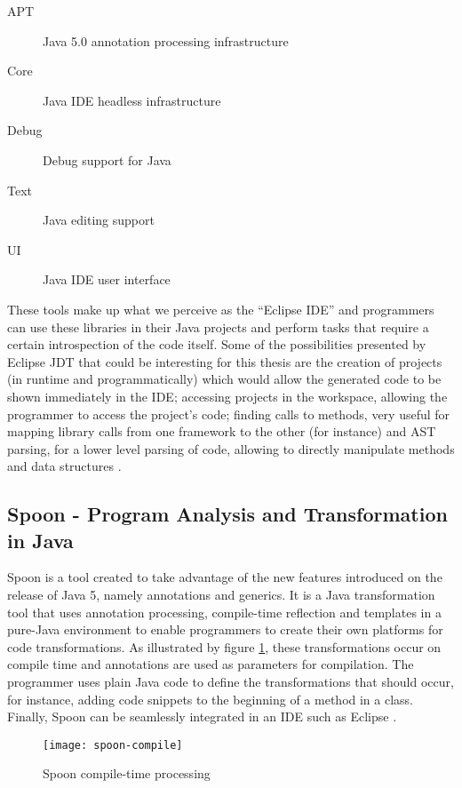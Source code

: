 	\begin{description}
		\item[APT] Java 5.0 annotation processing infrastructure
		\item[Core] Java IDE headless infrastructure
		\item[Debug] Debug support for Java
		\item[Text] Java editing support
		\item[UI] Java IDE user interface 
	\end{description}

	These tools make up what we perceive as the ``Eclipse IDE'' and programmers can use these libraries in their Java projects and perform tasks that require a certain introspection of the code itself. Some of the possibilities presented by Eclipse JDT that could be interesting for this thesis are the creation of projects (in runtime and programmatically) which would allow the generated code to be shown immediately in the IDE; accessing projects in the workspace, allowing the programmer to access the project's code; finding calls to methods, very useful for mapping library calls from one framework to the other (for instance) and AST parsing, for a lower level parsing of code, allowing to directly manipulate methods and data structures \cite{eclipseJDT}.


\subsection{Spoon - Program Analysis and Transformation in Java}
	Spoon is a tool created to take advantage of the new features introduced on the release of Java 5, namely annotations and generics. It is a Java transformation tool that uses annotation processing, compile-time reflection and templates in a pure-Java environment to enable programmers to create their own platforms for code transformations. As illustrated by figure \ref{fig:spoon-compile}, these transformations occur on compile time and annotations are used as parameters for compilation. The programmer uses plain Java code to define the transformations that should occur, for instance, adding code snippets to the beginning of a method in a class. Finally, Spoon can be seamlessly integrated in an IDE such as Eclipse \cite{spoon,pawlak2006spoon}.

	\begin{figure}[h]
	  \begin{center}
	    \leavevmode
	    \texttt{[image: spoon-compile]}
	    \caption{Spoon compile-time processing \cite{pawlak2006spoon}}
	    \label{fig:spoon-compile}
	  \end{center}
	\end{figure}

